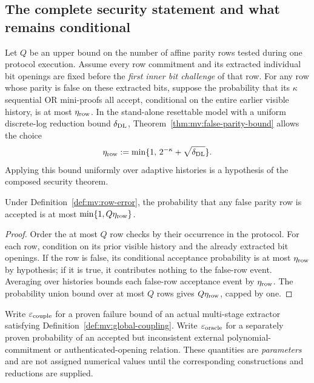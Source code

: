 \subsection{The complete security statement and what remains conditional}\label{sec:mv:boundary}

\begin{definition}\label{def:mv:row-error}
Let $Q$ be an upper bound on the number
of affine parity rows tested during one
protocol execution. Assume every row
commitment and its extracted individual
bit openings are fixed before the
\emph{first inner bit challenge} of that row.
For any row whose parity is false
on these extracted bits, suppose the
probability that its $\kappa$ sequential
OR mini-proofs all accept, conditional
on the entire earlier visible history,
is at most $\eta_{\rm row}$.
In the stand-alone resettable
model with a uniform discrete-log
reduction bound $\delta_{\rm DL}$,
Theorem~\ref{thm:mv:false-parity-bound}
allows the choice
\[
 \eta_{\rm row}:=
 \min\{1,\,2^{-\kappa}+\sqrt{\delta_{\rm DL}}\}.
\]
Applying this bound uniformly over
adaptive histories is a hypothesis of
the composed security theorem.
\end{definition}

\begin{lemma}\label{lem:mv:row-union}
Under Definition~\ref{def:mv:row-error},
the probability that any false
parity row is accepted is at most
$\min\{1,Q\eta_{\rm row}\}$.
\end{lemma}
\begin{proof}
Order the at most $Q$ row checks
by their occurrence in the protocol.
For each row, condition on its
prior visible history and the
already extracted bit openings.
If the row is false, its
conditional acceptance probability
is at most $\eta_{\rm row}$ by
hypothesis; if it is true, it
contributes nothing to the
false-row event. Averaging over
histories bounds each false-row
acceptance event by $\eta_{\rm row}$.
The probability union bound
over at most $Q$ rows gives
$Q\eta_{\rm row}$, capped by one.
\end{proof}

\begin{definition}\label{def:mv:coupling-error}
Write $\varepsilon_{\rm couple}$ for
a proven failure bound of an actual
multi-stage extractor satisfying
Definition~\ref{def:mv:global-coupling}.
Write $\varepsilon_{\rm oracle}$ for
a separately proven probability of
an accepted but inconsistent
external polynomial-commitment
or authenticated-opening relation.
These quantities are \emph{parameters}
and are not assigned numerical values
until the corresponding constructions
and reductions are supplied.
\end{definition}

